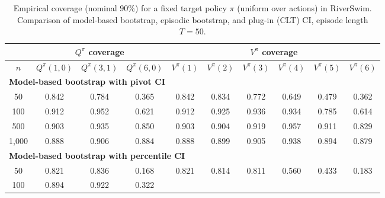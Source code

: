 \documentclass{article}
\numberwithin{equation}{section}
\begin{document}
\begin{table}[ht]
\centering
\caption{Empirical coverage (nominal $90\%$) for a fixed target policy $\pi$ (uniform over actions) in RiverSwim. Comparison of model-based bootstrap, episodic bootstrap, and plug-in (CLT) CI, episode length $T=50$.}
\label{tab:riverswim-uniform-coverage-90}
\begin{tabular}{c|ccc|cccccc}
\hline
& \multicolumn{3}{c|}{$Q^\pi$ coverage} & \multicolumn{6}{c}{$V^\pi$ coverage} \\ \hline
$n$
& $Q^\pi(1,0)$ & $Q^\pi(3,1)$ & $Q^\pi(6,0)$
& $V^\pi(1)$ & $V^\pi(2)$ & $V^\pi(3)$ & $V^\pi(4)$ & $V^\pi(5)$ & $V^\pi(6)$ \\
\hline
\multicolumn{10}{l}{\textbf{Model-based bootstrap with pivot CI}} \\ \hline
50
& \cellcolor{covheat!71!white}0.842 & \cellcolor{covheat!42!white}0.784 & 0.365
& \cellcolor{covheat!71!white}0.842 & \cellcolor{covheat!67!white}0.834 & \cellcolor{covheat!36!white}0.772 & 0.649 & 0.479 & 0.362 \\
100
& \cellcolor{covheat!100!white}0.912 & \cellcolor{covheat!100!white}0.952 & 0.621
& \cellcolor{covheat!100!white}0.912 & \cellcolor{covheat!100!white}0.925 & \cellcolor{covheat!100!white}0.936 & \cellcolor{covheat!100!white}0.934 & \cellcolor{covheat!43!white}0.785 & 0.614 \\
500
& \cellcolor{covheat!100!white}0.903 & \cellcolor{covheat!100!white}0.935 & \cellcolor{covheat!75!white}0.850
& \cellcolor{covheat!100!white}0.903 & \cellcolor{covheat!100!white}0.904 & \cellcolor{covheat!100!white}0.919 & \cellcolor{covheat!100!white}0.957 & \cellcolor{covheat!100!white}0.911 & \cellcolor{covheat!64!white}0.829 \\
1{,}000
& \cellcolor{covheat!94!white}0.888 & \cellcolor{covheat!100!white}0.906 & \cellcolor{covheat!92!white}0.884
& \cellcolor{covheat!94!white}0.888 & \cellcolor{covheat!100!white}0.899 & \cellcolor{covheat!100!white}0.905 & \cellcolor{covheat!100!white}0.938 & \cellcolor{covheat!97!white}0.894 & \cellcolor{covheat!89!white}0.879 \\
\hline
\multicolumn{10}{l}{\textbf{Model-based bootstrap with percentile CI}} \\ \hline
50
& \cellcolor{covheat!60!white}0.821 & \cellcolor{covheat!68!white}0.836 & 0.168
& \cellcolor{covheat!60!white}0.821 & \cellcolor{covheat!57!white}0.814 & \cellcolor{covheat!56!white}0.811 & 0.560 & 0.433 & 0.183 \\
100
& \cellcolor{covheat!97!white}0.894 & \cellcolor{covheat!100!white}0.922 & 0.322

\end{tabular}
\end{table}
\end{document}
